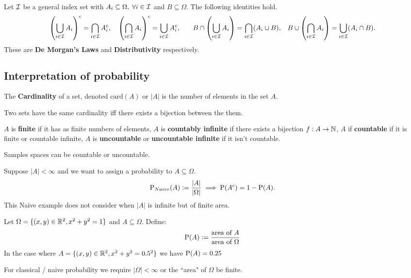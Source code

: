 \documentclass[../Year1/Year1.tex]{subfiles}
\begin{document}
Let $\III$ be a general index set with $A_i \subseteq\Omega,\; \forall i \in\III$ and $B \subseteq \Omega$. The following identities hold.
\[
\left( \bigcup_{i\in\III}A_i \right)^c = \bigcap_{i\in\III}A_i^c \textcolor{black}{,} \quad
\left( \bigcap_{i\in\III}A_i \right)^c = \bigcup_{i\in\III}A_i^c \textcolor{black}{,} \qquad
B \cap \left( \bigcup_{i\in\III}A_i \right) = \bigcap_{i\in\III}(A_i\cup B) \textcolor{black}{,} \quad
B \cup \left( \bigcap_{i\in\III}A_i \right) = \bigcup_{i\in\III}(A_i\cap B) \textcolor{black}{.}
\]
These are \textbf{De Morgan's Laws} and \textbf{Distributivity} respectively.


\subsection{Interpretation of probability}
\begin{definition}
    The \textbf{Cardinality} of a set, denoted $\text{card}(A)$ or $|A|$ is the number of elements in the set $A$.
\end{definition}

\begin{definition}
    Two sets have the same cardinality iff there exists a bijection between the them.
\end{definition}

\begin{definition}
    $A$ is \textbf{finite} if it has as finite numbers of elements, $A$ is \textbf{countably infinite} if there exists a bijection $f: A \to \NN$, $A$ if \textbf{countable} if it is finite or countable infinite, $A$ is \textbf{uncountable} or \textbf{uncountable infinite} if it isn't countable.
\end{definition}

Samples spaces can be countable or uncountable.

\begin{definition}
    Suppose $|A| < \infty$ and we want to assign a probability to $A \subseteq \Omega$.
    \[
    \P_{Naive}(A) := \frac{|A|}{|\Omega|} \implies \P(A^c) = 1 - \P(A)  \textcolor{black}{.}
    \]
    This Naive example does not consider when $|A|$ is infinite but of finite area.
\end{definition}
\begin{example}
    Let $\Omega = \{(x,y) \in \RR^2, x^2+y^2=1\}$ and $A\subseteq\Omega$. Define: 
    \[
    \P(A) := \frac{\text{area of } A}{\text{area of } \Omega}
    \]
    In the case where $A = \{(x,y) \in \RR^2, x^2+y^2=0.5^2\}$ we have $\P(A) = 0.25$
\end{example}
\begin{remark}
    For classical / naive probability we require $|\Omega| < \infty$ or the ``area" of $\Omega$ be finite. 
\end{remark}
\end{document}
